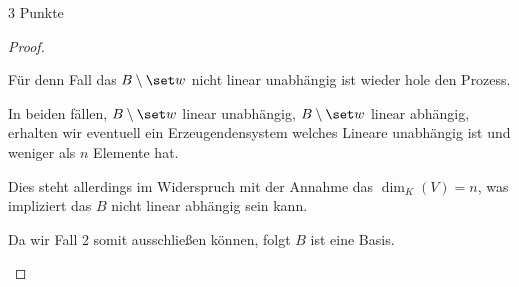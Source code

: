 \documentclass{problemset}
\begin{document}
\begin{problem}{3 Punkte}
\begin{proof}
\begin{itemize}
\begin{itemize}
                        Für denn Fall das $B \setminus \set w$ nicht linear
                        unabhängig ist wieder hole den Prozess.

                        In beiden fällen, $B \setminus \set w$ linear
                        unabhängig, $B \setminus \set w$ linear abhängig,
                        erhalten wir eventuell ein Erzeugendensystem welches
                        Lineare unabhängig ist und weniger als $n$ Elemente
                        hat.

                        Dies steht allerdings im Widerspruch mit der Annahme
                        das $\dim_K(V) = n$, was impliziert das $B$ nicht
                        linear abhängig sein kann.
              \end{itemize}

              Da wir Fall 2 somit ausschließen können, folgt $B$ ist eine
              Basis. \checkmark
    \end{itemize}
\end{proof}
\end{problem}
\end{document}
